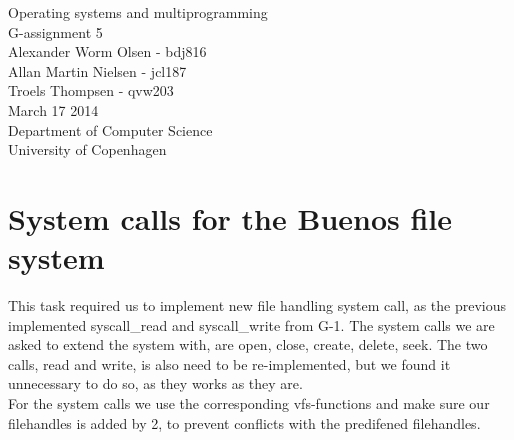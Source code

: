 \documentclass[12pt,a4paper,danish]{article}
\begin{document}
\begin{titlepage}
    \vspace*{\fill}
    \begin{center}
      {\Huge Operating systems and multiprogramming}\\[0.7cm]
      {\huge G-assignment 5}\\[0.7cm]
      {\large Alexander Worm Olsen - bdj816}\\[0.4cm]
      {\large Allan Martin Nielsen - jcl187}\\[0.4cm]
      {\large Troels Thompsen - qvw203}\\[0.4cm]
      {\small March 17 2014}\\[0.3cm] 
      {\small Department of Computer Science}\\
      {\small University of Copenhagen}
    \end{center}
    \vspace*{\fill}
\end{titlepage}

\section{System calls for the Buenos file system}
This task required us to implement new file handling system call, as the previous implemented syscall_read and syscall_write from G-1. The system calls we are asked to extend the system with, are open, close, create, delete, seek.
The two calls, read and write, is also need to be re-implemented, but we found it unnecessary to do so, as they works as they are.\\
For the system calls we use the corresponding vfs-functions and make sure our filehandles is added by 2, to prevent conflicts with the predifened filehandles.
\end{document}
